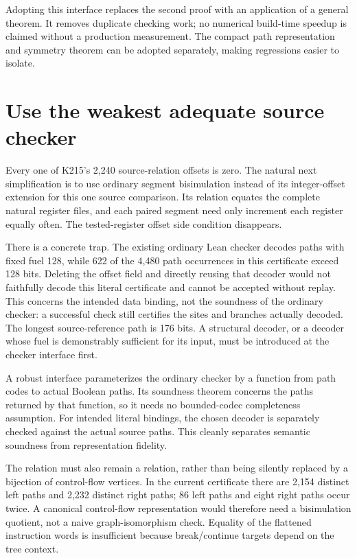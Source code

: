 \documentclass[11pt]{article}
\newcommand{\code}[1]{\texttt{\detokenize{#1}}}
\begin{document}
Adopting this interface replaces the second \code{vm_compute} proof with an application of a general theorem. It removes duplicate checking work; no numerical build-time speedup is claimed without a production measurement. The compact path representation and symmetry theorem can be adopted separately, making regressions easier to isolate.

\section{Use the weakest adequate source checker}
\label{sec:plain}

Every one of K215's 2,240 source-relation offsets is zero. The natural next simplification is to use ordinary segment bisimulation instead of its integer-offset extension for this one source comparison. Its relation equates the complete natural register files, and each paired segment need only increment each register equally often. The tested-register offset side condition disappears.

There is a concrete trap. The existing ordinary Lean checker decodes paths with fixed fuel 128, while 622 of the 4,480 path occurrences in this certificate exceed 128 bits. Deleting the offset field and directly reusing that decoder would not faithfully decode this literal certificate and cannot be accepted without replay. This concerns the intended data binding, not the soundness of the ordinary checker: a successful check still certifies the sites and branches actually decoded. The longest source-reference path is 176 bits. A structural decoder, or a decoder whose fuel is demonstrably sufficient for its input, must be introduced at the checker interface first.

A robust interface parameterizes the ordinary checker by a function from path codes to actual Boolean paths. Its soundness theorem concerns the paths returned by that function, so it needs no bounded-codec completeness assumption. For intended literal bindings, the chosen decoder is separately checked against the actual source paths. This cleanly separates semantic soundness from representation fidelity.

The relation must also remain a relation, rather than being silently replaced by a bijection of control-flow vertices. In the current certificate there are 2,154 distinct left paths and 2,232 distinct right paths; 86 left paths and eight right paths occur twice. A canonical control-flow representation would therefore need a bisimulation quotient, not a naive graph-isomorphism check. Equality of the flattened instruction words is insufficient because break/continue targets depend on the tree context.
\end{document}
